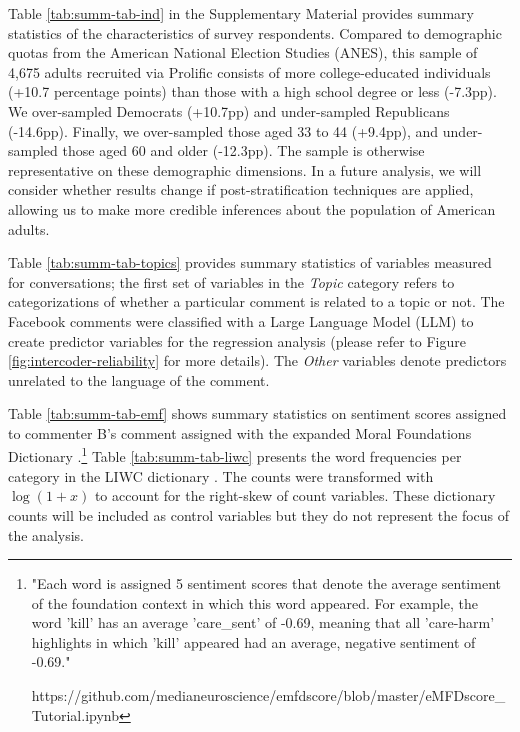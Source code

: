 \documentclass{article}
\begin{document}
Table \ref{tab:summ-tab-ind} in the Supplementary Material provides summary statistics of the characteristics of survey respondents. Compared to demographic quotas from the American National Election Studies (ANES), this sample of 4,675 adults recruited via Prolific consists of more college-educated individuals (+10.7 percentage points) than those with a high school degree or less (-7.3pp). We over-sampled Democrats (+10.7pp) and under-sampled Republicans (-14.6pp). Finally, we over-sampled those aged 33 to 44 (+9.4pp), and under-sampled those aged 60 and older (-12.3pp). The sample is otherwise representative on these demographic dimensions. In a future analysis, we will consider whether results change if post-stratification techniques are applied, allowing us to make more credible inferences about the population of American adults.


Table \ref{tab:summ-tab-topics} provides summary statistics of variables measured for conversations; the first set of variables in the \textit{Topic} category refers to categorizations of whether a particular comment is related to a topic or not. The Facebook comments were classified with a Large Language Model (LLM) to create predictor variables for the regression analysis (please refer to Figure \ref{fig:intercoder-reliability} for more details). The \textit{Other} variables denote predictors unrelated to the language of the comment.


Table \ref{tab:summ-tab-emf} shows summary statistics on sentiment scores assigned to commenter B's comment assigned with the expanded Moral Foundations Dictionary \citep{hopp2021extended}.\footnote{"Each word is assigned 5 sentiment scores that denote the average sentiment of the foundation context in which this word appeared. For example, the word 'kill' has an average 'care_sent' of -0.69, meaning that all 'care-harm' highlights in which 'kill' appeared had an average, negative sentiment of -0.69." 

https://github.com/medianeuroscience/emfdscore/blob/master/eMFDscore_Tutorial.ipynb}
Table \ref{tab:summ-tab-liwc} presents the word frequencies per category in the LIWC dictionary \citep{pennebaker_linguistic_2022}. The counts were transformed with $\log(1+x)$ to account for the right-skew of count variables. These dictionary counts will be included as control variables but they do not represent the focus of the analysis.
\end{document}
